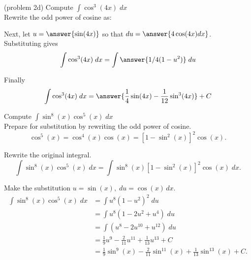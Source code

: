 \documentclass{ximera}
\begin{document}
\begin{problem}(problem 2d)
Compute $\displaystyle{\int \cos^3(4x) \; dx}$\\

Rewrite the odd power of cosine as:

\begin{multipleChoice}
\end{multipleChoice}

Next, let $u = \answer{\sin(4x)}$ so that $du = \answer{4\cos(4x) dx}$.\\

Substituting gives
\[
\int \cos^3(4x) \; dx= \int \answer{1/4 (1-u^2)} \; du
\]

Finally
\[
\int \cos^3(4x) \; dx= \answer{\frac14 \sin(4x) - \frac{1}{12} \sin^3(4x) } + C
\]

\end{problem}





\begin{example}[example 3]
Compute $\displaystyle{\int \sin^8(x)\cos^5(x) \; dx}$\\

Prepare for substitution by rewriting the odd power of cosine.
\[
\cos^5(x) = \cos^4(x) \cos(x) = \left[1 - \sin^2(x)\right]^2 \cos(x).
\]

Rewrite the original integral.
\[
\int \sin^8(x)\cos^5(x) \; dx = \int \sin^8(x)\left[1 - \sin^2(x)\right]^2 \cos(x) \; dx.
\]

Make the substitution $u = \sin(x), \; du = \cos(x) \, dx$.
\begin{align*}
\int \sin^8(x)\cos^5(x) \; dx &= \int u^8 (1-u^2)^2 \; du\\
   &= \int u^8 (1-2u^2 + u^4) \; du\\
   &= \int (u^8 -2u^{10} + u^{12}) \; du\\
  &= \tfrac19 u^9 - \tfrac{2}{11}u^{11} + \tfrac{1}{13} u^{13} + C \\
  &= \tfrac19 \sin^9(x) - \tfrac{2}{11} \sin^{11}(x)  + \tfrac{1}{13} \sin^{13}(x) + C.
\end{align*}
  
\end{example}
\end{document}
